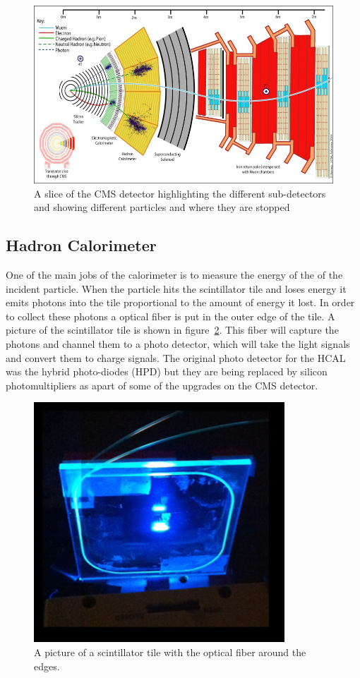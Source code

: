 \begin{figure}
\centering
\includegraphics[width=\linewidth]{Figures/CMSlayout.jpg}
\caption{A slice of the CMS detector highlighting the different sub-detectors and showing different particles and where they are stopped}
\label{fig:CMSlayout}
\end{figure}

\subsection{Hadron Calorimeter}
One of the main jobs of the calorimeter is to measure the energy of the of the incident particle. When the particle hits the scintillator tile and loses energy it emits photons into the tile proportional to the amount of energy it lost. In order to collect these photons a optical fiber is put in the outer edge of the tile. A picture of the scintillator tile is shown in figure~\ref{fig:Tile}. This fiber will capture the photons and channel them to a photo detector, which will take the light signals and convert them to charge signals. The original photo detector for the HCAL was the hybrid photo-diodes (HPD) but they are being replaced by silicon photomultipliers as apart of some of the upgrades on the CMS detector. 

\begin{figure}
\centering
\includegraphics[width=0.6\linewidth]{Figures/Tile.png}
\caption{A picture of a scintillator tile with the optical fiber around the edges.}
\label{fig:Tile}
\end{figure}


